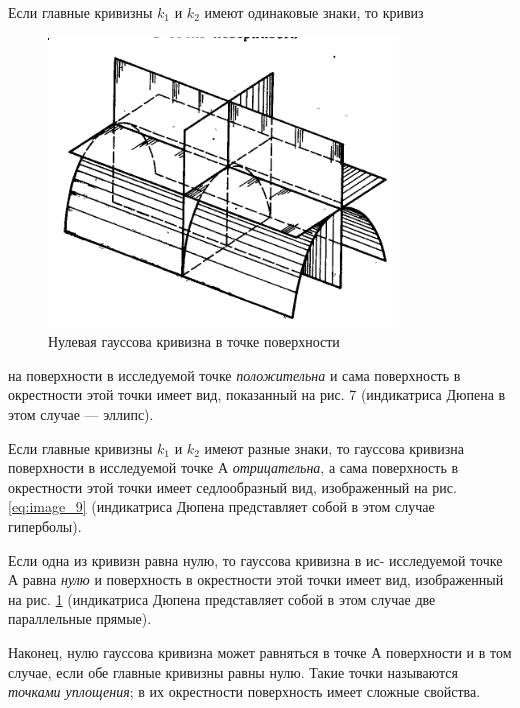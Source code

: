Если главные кривизны $k_1$ и $k_2$ имеют одинаковые знаки, то кривиз    
\begin{figure}
    \includegraphics[width=\linewidth]{fig_10}
    \caption{Нулевая гауссова кривизна в точке
        поверхности}
    \label{eq:image_10}
\end{figure} на поверхности в исследуемой точке \textit{положительна} и сама поверхность в окрестности этой точки имеет вид, показанный на рис. 7 (индикатриса Дюпена в этом случае — эллипс).

Если главные кривизны $k_1$ и $k_2$ имеют разные знаки, то гауссова кривизна поверхности в исследуемой точке А \textit{отрицательна}, а сама поверхность в окрестности этой точки имеет седлообразный вид, изображенный на рис. \ref{eq:image_9} (индикатриса Дюпена представляет собой
в этом случае гиперболы).

Если одна из кривизн равна нулю, то гауссова кривизна в ис-
исследуемой точке А равна \textit{нулю} и поверхность
в окрестности этой точки имеет вид, изображенный на рис. \ref{eq:image_10} (индикатриса Дюпена представляет собой в этом случае две параллельные прямые).

Наконец, нулю гауссова кривизна может равняться в точке А
поверхности и в том случае, если обе главные кривизны равны
нулю. Такие точки называются \textit{точками уплощения}; в их окрестности поверхность имеет сложные свойства.

\newpage
